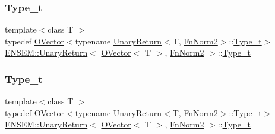 \subsubsection{\texorpdfstring{Type\_t}{Type\_t}\hspace{0.1cm}{\footnotesize\ttfamily [1/3]}}
{\footnotesize\ttfamily template$<$class T $>$ \\
typedef \mbox{\hyperlink{classENSEM_1_1OVector}{O\+Vector}}$<$typename \mbox{\hyperlink{structENSEM_1_1UnaryReturn}{Unary\+Return}}$<$T, \mbox{\hyperlink{structENSEM_1_1FnNorm2}{Fn\+Norm2}}$>$\+::\mbox{\hyperlink{structENSEM_1_1UnaryReturn_3_01OVector_3_01T_01_4_00_01FnNorm2_01_4_a67bb1e2e118524484dc34c80b8d75046}{Type\+\_\+t}}$>$ \mbox{\hyperlink{structENSEM_1_1UnaryReturn}{E\+N\+S\+E\+M\+::\+Unary\+Return}}$<$ \mbox{\hyperlink{classENSEM_1_1OVector}{O\+Vector}}$<$ T $>$, \mbox{\hyperlink{structENSEM_1_1FnNorm2}{Fn\+Norm2}} $>$\+::\mbox{\hyperlink{structENSEM_1_1UnaryReturn_3_01OVector_3_01T_01_4_00_01FnNorm2_01_4_a67bb1e2e118524484dc34c80b8d75046}{Type\+\_\+t}}}

\mbox{\label{structENSEM_1_1UnaryReturn_3_01OVector_3_01T_01_4_00_01FnNorm2_01_4_a67bb1e2e118524484dc34c80b8d75046}} 
\subsubsection{\texorpdfstring{Type\_t}{Type\_t}\hspace{0.1cm}{\footnotesize\ttfamily [2/3]}}
{\footnotesize\ttfamily template$<$class T $>$ \\
typedef \mbox{\hyperlink{classENSEM_1_1OVector}{O\+Vector}}$<$typename \mbox{\hyperlink{structENSEM_1_1UnaryReturn}{Unary\+Return}}$<$T, \mbox{\hyperlink{structENSEM_1_1FnNorm2}{Fn\+Norm2}}$>$\+::\mbox{\hyperlink{structENSEM_1_1UnaryReturn_3_01OVector_3_01T_01_4_00_01FnNorm2_01_4_a67bb1e2e118524484dc34c80b8d75046}{Type\+\_\+t}}$>$ \mbox{\hyperlink{structENSEM_1_1UnaryReturn}{E\+N\+S\+E\+M\+::\+Unary\+Return}}$<$ \mbox{\hyperlink{classENSEM_1_1OVector}{O\+Vector}}$<$ T $>$, \mbox{\hyperlink{structENSEM_1_1FnNorm2}{Fn\+Norm2}} $>$\+::\mbox{\hyperlink{structENSEM_1_1UnaryReturn_3_01OVector_3_01T_01_4_00_01FnNorm2_01_4_a67bb1e2e118524484dc34c80b8d75046}{Type\+\_\+t}}}

